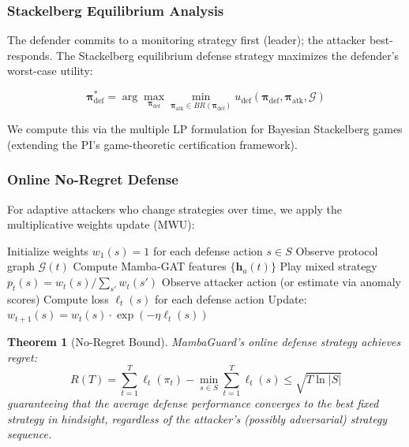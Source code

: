 \documentclass[12pt,a4paper]{article}
\newtheorem{theorem}{Theorem}
\newcommand{\calG}{\mathcal{G}}
\begin{document}
\subsubsection{Stackelberg Equilibrium Analysis}

The defender commits to a monitoring strategy first (leader); the attacker best-responds. The Stackelberg equilibrium defense strategy maximizes the defender's worst-case utility:

\begin{equation}
    \boldsymbol{\pi}_{\text{def}}^* = \arg\max_{\boldsymbol{\pi}_{\text{def}}} \min_{\boldsymbol{\pi}_{\text{atk}} \in BR(\boldsymbol{\pi}_{\text{def}})} u_{\text{def}}(\boldsymbol{\pi}_{\text{def}}, \boldsymbol{\pi}_{\text{atk}}, \calG)
\end{equation}

We compute this via the multiple LP formulation for Bayesian Stackelberg games (extending the PI's game-theoretic certification framework).

\subsubsection{Online No-Regret Defense}

For adaptive attackers who change strategies over time, we apply the multiplicative weights update (MWU):

\begin{algorithm}[H]
\caption{MambaGuard Online Defense}
\begin{algorithmic}[1]
\STATE Initialize weights $w_1(s) = 1$ for each defense action $s \in S$
    \STATE Observe protocol graph $\calG(t)$
    \STATE Compute Mamba-GAT features $\{\mathbf{h}_a(t)\}$
    \STATE Play mixed strategy $p_t(s) = w_t(s) / \sum_{s'} w_t(s')$
    \STATE Observe attacker action (or estimate via anomaly scores)
    \STATE Compute loss $\ell_t(s)$ for each defense action
    \STATE Update: $w_{t+1}(s) = w_t(s) \cdot \exp(-\eta \ell_t(s))$
\ENDFOR
\end{algorithmic}
\end{algorithm}

\begin{theorem}[No-Regret Bound]
MambaGuard's online defense strategy achieves regret:
\begin{equation}
    R(T) = \sum_{t=1}^T \ell_t(\pi_t) - \min_{s \in S} \sum_{t=1}^T \ell_t(s) \leq \sqrt{T \ln |S|}
\end{equation}
guaranteeing that the average defense performance converges to the best fixed strategy in hindsight, regardless of the attacker's (possibly adversarial) strategy sequence.
\end{theorem}
\end{document}

